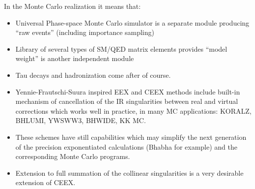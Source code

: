 \documentclass[dvips]{seminar}                      %
\begin{document}
\begin{slide}
\vspace{-2mm}

\begin{minipage}{52mm}
{}
\end{minipage}
\begin{minipage}{52mm}
\cbl\small
In the Monte Carlo realization it means that:
\begin{itemize}
\item Universal Phase-space Monte Carlo simulator is a separate module
      producing ``raw events'' (including importance sampling)
\item Library of several types of SM/QED matrix elements provides
      ``model weight'' is another independent module
\item Tau decays and hadronization come after of course.
\end{itemize}
\end{minipage}
\vfill
\end{slide}   %




\begin{slide}

{\bf\cbl
  \begin{itemize}
  \item Yennie-Frautschi-Suura inspired EEX and CEEX methods include built-in
    mechanism of cancellation of the IR singularities between real and virtual corrections
    which works well in practice, in many MC applications:
    KORALZ, BHLUMI, YWSWW3, BHWIDE, KK MC.
  \item These schemes have still capabilities which may simplify the
    next generation of the precision exponentiated  calculations
    (Bhabha for example) and the corresponding Monte Carlo programs.
  \item Extension to full \Order{\alpha^\infty} summation of the collinear singularities
    is a very desirable extension of CEEX.
  \end{itemize}
}

\vfill
\end{slide}    %
\end{document}

